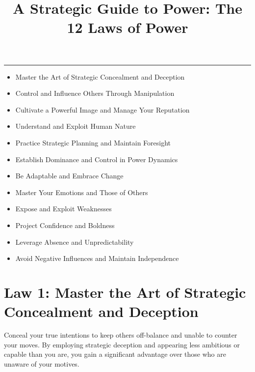 \documentclass[a4paper,10.8pt]{article}
\title{A Strategic Guide to Power: The 12 Laws of Power}
\author{}
\date{}
\begin{document}
\maketitle
\vspace{-2cm}
\begin{center}
    \rule{0.8\textwidth}{1pt}
\end{center}

\vspace{1cm}
\begin{itemize}[leftmargin=0pt, label={}, itemsep=0.45cm]
    \centering
    \item \large Master the Art of Strategic Concealment and Deception
    \item \large Control and Influence Others Through Manipulation
    \item \large Cultivate a Powerful Image and Manage Your Reputation
    \item \large Understand and Exploit Human Nature
    \item \large Practice Strategic Planning and Maintain Foresight
    \item \large Establish Dominance and Control in Power Dynamics
    \item \large Be Adaptable and Embrace Change
    \item \large Master Your Emotions and Those of Others
    \item \large Expose and Exploit Weaknesses
    \item \large Project Confidence and Boldness
    \item \large Leverage Absence and Unpredictability
    \item \large Avoid Negative Influences and Maintain Independence
\end{itemize}

\clearpage

\section*{Law 1: Master the Art of Strategic Concealment and Deception}
Conceal your true intentions to keep others off-balance and unable to counter your moves. By employing strategic deception and appearing less ambitious or capable than you are, you gain a significant advantage over those who are unaware of your motives.
\end{document}
